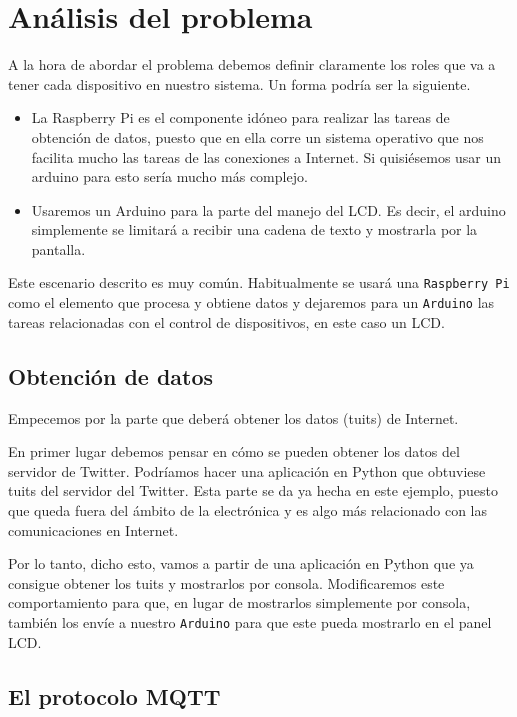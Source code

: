 \section{Análisis del problema} %
\label{sec:an_lisis_del_problema}

A la hora de abordar el problema debemos definir claramente los roles que va
a tener cada dispositivo en nuestro sistema. Un forma podría ser la siguiente.

\begin{itemize}
	\item La Raspberry Pi es el componente idóneo para realizar las tareas de
	obtención de datos, puesto que en ella corre un sistema operativo que nos
	facilita mucho las tareas de las conexiones a Internet. Si quisiésemos usar
	un arduino para esto sería mucho más complejo.
	\item Usaremos un Arduino para la parte del manejo del LCD. Es decir, el
	arduino simplemente se limitará a recibir una cadena de texto y mostrarla
	por la pantalla.
\end{itemize}

Este escenario descrito es muy común. Habitualmente se usará una
\texttt{Raspberry Pi} como el elemento que procesa y obtiene datos y dejaremos
para un \texttt{Arduino} las tareas relacionadas con el control de dispositivos,
en este caso un LCD.

\subsection{Obtención de datos} %
\label{sub:obtenci_n_de_datos}

Empecemos por la parte que deberá obtener los datos (tuits) de Internet.

En primer lugar debemos pensar en cómo se pueden obtener los datos del servidor
de Twitter. Podríamos hacer una aplicación en Python que obtuviese tuits del
servidor del Twitter. Esta parte se da ya hecha en este ejemplo, puesto que queda
fuera del ámbito de la electrónica y es algo más relacionado con las
comunicaciones en Internet.

Por lo tanto, dicho esto, vamos a partir de una aplicación en Python que ya
consigue obtener los tuits y mostrarlos por consola. Modificaremos este
comportamiento para que, en lugar de mostrarlos simplemente por consola, también
los envíe a nuestro \texttt{Arduino} para que este pueda mostrarlo en el panel
LCD.

\subsection{El protocolo MQTT} %
\label{sub:el_protocolo_mqtt}

